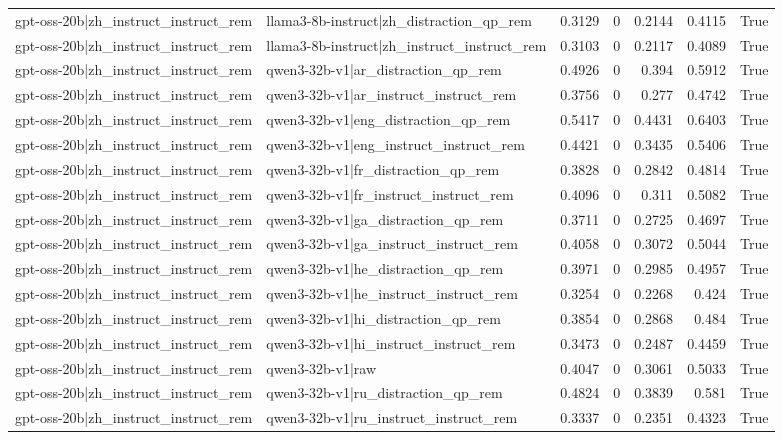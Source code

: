 \begin{table}
\begin{tabular}{l l r r r r l}
gpt-oss-20b|zh_instruct_instruct_rem & llama3-8b-instruct|zh_distraction_qp_rem & 0.3129 & 0 & 0.2144 & 0.4115 & True \\
gpt-oss-20b|zh_instruct_instruct_rem & llama3-8b-instruct|zh_instruct_instruct_rem & 0.3103 & 0 & 0.2117 & 0.4089 & True \\
gpt-oss-20b|zh_instruct_instruct_rem & qwen3-32b-v1|ar_distraction_qp_rem & 0.4926 & 0 & 0.394 & 0.5912 & True \\
gpt-oss-20b|zh_instruct_instruct_rem & qwen3-32b-v1|ar_instruct_instruct_rem & 0.3756 & 0 & 0.277 & 0.4742 & True \\
gpt-oss-20b|zh_instruct_instruct_rem & qwen3-32b-v1|eng_distraction_qp_rem & 0.5417 & 0 & 0.4431 & 0.6403 & True \\
gpt-oss-20b|zh_instruct_instruct_rem & qwen3-32b-v1|eng_instruct_instruct_rem & 0.4421 & 0 & 0.3435 & 0.5406 & True \\
gpt-oss-20b|zh_instruct_instruct_rem & qwen3-32b-v1|fr_distraction_qp_rem & 0.3828 & 0 & 0.2842 & 0.4814 & True \\
gpt-oss-20b|zh_instruct_instruct_rem & qwen3-32b-v1|fr_instruct_instruct_rem & 0.4096 & 0 & 0.311 & 0.5082 & True \\
gpt-oss-20b|zh_instruct_instruct_rem & qwen3-32b-v1|ga_distraction_qp_rem & 0.3711 & 0 & 0.2725 & 0.4697 & True \\
gpt-oss-20b|zh_instruct_instruct_rem & qwen3-32b-v1|ga_instruct_instruct_rem & 0.4058 & 0 & 0.3072 & 0.5044 & True \\
gpt-oss-20b|zh_instruct_instruct_rem & qwen3-32b-v1|he_distraction_qp_rem & 0.3971 & 0 & 0.2985 & 0.4957 & True \\
gpt-oss-20b|zh_instruct_instruct_rem & qwen3-32b-v1|he_instruct_instruct_rem & 0.3254 & 0 & 0.2268 & 0.424 & True \\
gpt-oss-20b|zh_instruct_instruct_rem & qwen3-32b-v1|hi_distraction_qp_rem & 0.3854 & 0 & 0.2868 & 0.484 & True \\
gpt-oss-20b|zh_instruct_instruct_rem & qwen3-32b-v1|hi_instruct_instruct_rem & 0.3473 & 0 & 0.2487 & 0.4459 & True \\
gpt-oss-20b|zh_instruct_instruct_rem & qwen3-32b-v1|raw & 0.4047 & 0 & 0.3061 & 0.5033 & True \\
gpt-oss-20b|zh_instruct_instruct_rem & qwen3-32b-v1|ru_distraction_qp_rem & 0.4824 & 0 & 0.3839 & 0.581 & True \\
gpt-oss-20b|zh_instruct_instruct_rem & qwen3-32b-v1|ru_instruct_instruct_rem & 0.3337 & 0 & 0.2351 & 0.4323 & True \\

\end{tabular}
\end{table}
